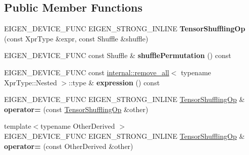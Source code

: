 \subsection*{Public Member Functions}
\begin{DoxyCompactItemize}
\item 
\mbox{\label{class_eigen_1_1_tensor_shuffling_op_a1e2f5c8ec873d01107a34fdaa4eb9768}} 
E\+I\+G\+E\+N\+\_\+\+D\+E\+V\+I\+C\+E\+\_\+\+F\+U\+NC E\+I\+G\+E\+N\+\_\+\+S\+T\+R\+O\+N\+G\+\_\+\+I\+N\+L\+I\+NE {\bfseries Tensor\+Shuffling\+Op} (const Xpr\+Type \&expr, const Shuffle \&shuffle)
\item 
\mbox{\label{class_eigen_1_1_tensor_shuffling_op_a33c0520c63ee2377091f1cb5d74e1ed9}} 
E\+I\+G\+E\+N\+\_\+\+D\+E\+V\+I\+C\+E\+\_\+\+F\+U\+NC const Shuffle \& {\bfseries shuffle\+Permutation} () const
\item 
\mbox{\label{class_eigen_1_1_tensor_shuffling_op_a9dcda3d202608177a9a8a85f87335a93}} 
E\+I\+G\+E\+N\+\_\+\+D\+E\+V\+I\+C\+E\+\_\+\+F\+U\+NC const \hyperlink{struct_eigen_1_1internal_1_1remove__all}{internal\+::remove\+\_\+all}$<$ typename Xpr\+Type\+::\+Nested $>$\+::type \& {\bfseries expression} () const
\item 
\mbox{\label{class_eigen_1_1_tensor_shuffling_op_a05714d20a89f48754cd6e54ef6e9bc2f}} 
E\+I\+G\+E\+N\+\_\+\+D\+E\+V\+I\+C\+E\+\_\+\+F\+U\+NC E\+I\+G\+E\+N\+\_\+\+S\+T\+R\+O\+N\+G\+\_\+\+I\+N\+L\+I\+NE \hyperlink{class_eigen_1_1_tensor_shuffling_op}{Tensor\+Shuffling\+Op} \& {\bfseries operator=} (const \hyperlink{class_eigen_1_1_tensor_shuffling_op}{Tensor\+Shuffling\+Op} \&other)
\item 
\mbox{\label{class_eigen_1_1_tensor_shuffling_op_a96948159bfbecc33d3c2a2e7efd45c40}} 
{\footnotesize template$<$typename Other\+Derived $>$ }\\E\+I\+G\+E\+N\+\_\+\+D\+E\+V\+I\+C\+E\+\_\+\+F\+U\+NC E\+I\+G\+E\+N\+\_\+\+S\+T\+R\+O\+N\+G\+\_\+\+I\+N\+L\+I\+NE \hyperlink{class_eigen_1_1_tensor_shuffling_op}{Tensor\+Shuffling\+Op} \& {\bfseries operator=} (const Other\+Derived \&other)
\item 
\mbox{\label{class_eigen_1_1_tensor_shuffling_op_a1e2f5c8ec873d01107a34fdaa4eb9768}} 

\end{DoxyCompactItemize}
